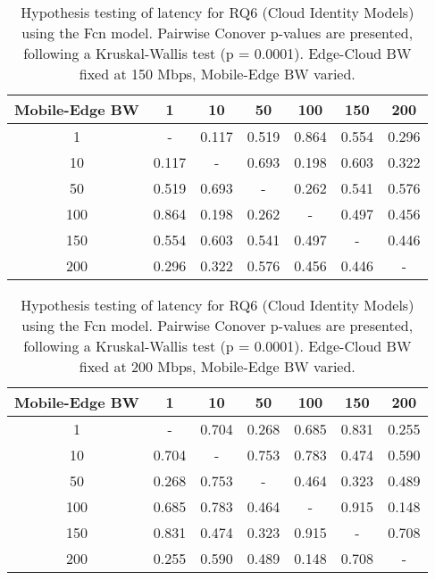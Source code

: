 \begin{table}[H]
\caption{Hypothesis testing of latency for RQ6 (Cloud Identity Models) using the Fcn model. Pairwise Conover p-values are presented, following a Kruskal-Wallis test (p = 0.0001). Edge-Cloud BW fixed at 150 Mbps, Mobile-Edge BW varied.}
\centering
\begin{tabular}{c|cccccc}
Mobile-Edge BW & 1 & 10 & 50 & 100 & 150 & 200 \\
\hline
1 & - & 0.117 & 0.519 & 0.864 & 0.554 & 0.296 \\
10 & 0.117 & - & 0.693 & 0.198 & 0.603 & 0.322 \\
50 & 0.519 & 0.693 & - & 0.262 & 0.541 & 0.576 \\
100 & 0.864 & 0.198 & 0.262 & - & 0.497 & 0.456 \\
150 & 0.554 & 0.603 & 0.541 & 0.497 & - & 0.446 \\
200 & 0.296 & 0.322 & 0.576 & 0.456 & 0.446 & - \\
\end{tabular}
\end{table}

\begin{table}[H]
\caption{Hypothesis testing of latency for RQ6 (Cloud Identity Models) using the Fcn model. Pairwise Conover p-values are presented, following a Kruskal-Wallis test (p = 0.0001). Edge-Cloud BW fixed at 200 Mbps, Mobile-Edge BW varied.}
\centering
\begin{tabular}{c|cccccc}
Mobile-Edge BW & 1 & 10 & 50 & 100 & 150 & 200 \\
\hline
1 & - & 0.704 & 0.268 & 0.685 & 0.831 & 0.255 \\
10 & 0.704 & - & 0.753 & 0.783 & 0.474 & 0.590 \\
50 & 0.268 & 0.753 & - & 0.464 & 0.323 & 0.489 \\
100 & 0.685 & 0.783 & 0.464 & - & 0.915 & 0.148 \\
150 & 0.831 & 0.474 & 0.323 & 0.915 & - & 0.708 \\
200 & 0.255 & 0.590 & 0.489 & 0.148 & 0.708 & - \\
\end{tabular}
\end{table}

